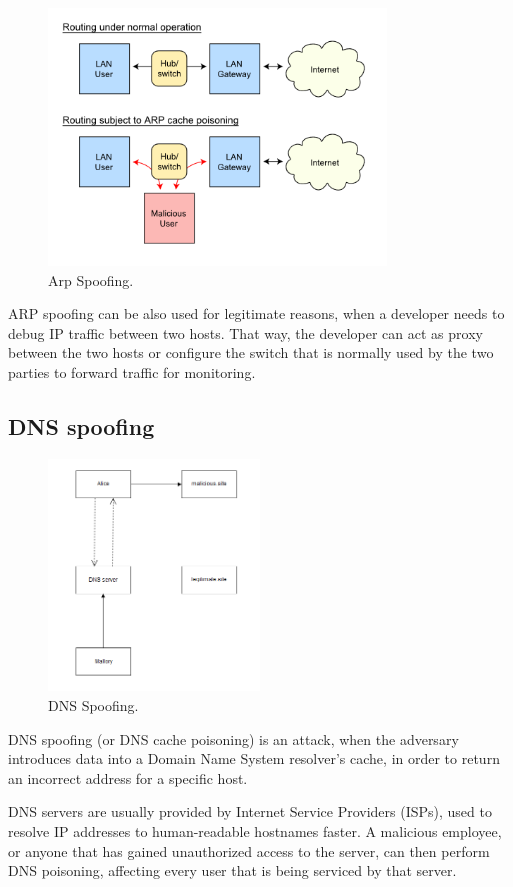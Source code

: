 \begin{figure}[H] \caption{Arp Spoofing.} \centering
\includegraphics[width=0.8\textwidth]{diagrams/arp_spoofing.png}\end{figure}

ARP spoofing can be also used for legitimate reasons, when a developer needs to
debug IP traffic between two hosts. That way, the developer can act as proxy
between the two hosts or configure the switch that is normally used by the two
parties to forward traffic for monitoring.

\subsection{DNS spoofing}

\begin{figure}[H] \caption{DNS Spoofing.} \centering
\includegraphics[width=0.5\textwidth]{diagrams/dns_spoofing.png}\end{figure}

DNS spoofing (or DNS cache poisoning) is an attack, when the adversary
introduces data into a Domain Name System resolver's cache, in order to return
an incorrect address for a specific host.

DNS servers are usually provided by Internet Service Providers (ISPs), used to
resolve IP addresses to human-readable hostnames faster. A malicious employee,
or anyone that has gained unauthorized access to the server, can then perform
DNS poisoning, affecting every user that is being serviced by that server.
